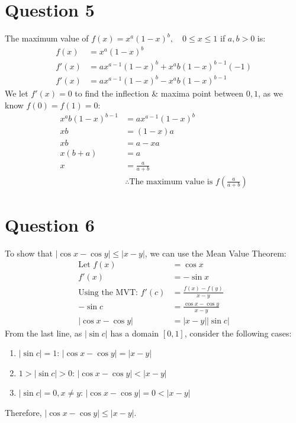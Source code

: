 \documentclass{article}
\begin{document}
\section*{Question 5}
The maximum value of $f(x)=x^a(1-x)^b,\quad0\leq x\leq1$ if $a,b > 0$ is:
\begin{align*}
    f(x)  & =x^a(1-x)^b                          \\
    f'(x) & =ax^{a-1}(1-x)^b+x^ab(1-x)^{b-1}(-1) \\
    f'(x) & =ax^{a-1}(1-x)^b-x^ab(1-x)^{b-1}
\end{align*}
We let $f'(x) = 0$ to find the inflection \& maxima point between $0,1$, as we know $f(0)=f(1)=0$:
\begin{align*}
    x^ab(1-x)^{b-1} & =ax^{a-1}(1-x)^b                                        \\
    xb              & =(1-x)a                                                 \\
    xb              & = a - xa                                                \\
    x(b+a)          & = a                                                     \\
    x               & = \frac{a}{a+b}                                         \\
                    & \therefore \text{The maximum value is }f(\frac{a}{a+b})
\end{align*}

\section*{Question 6}
To show that $|\cos x-\cos y|\leq|x-y|$, we can use the Mean Value Theorem:
\begin{align*}
    \text{Let }f(x)             & = \cos x                    \\
    f'(x)                       & = -\sin x                   \\
    \text{Using the MVT: }f'(c) & = \frac{f(x)-f(y)}{x-y}     \\
    -\sin c                     & = \frac{\cos x-\cos y}{x-y} \\
    |\cos x-\cos y|             & = |x-y||\sin c|
\end{align*}
From the last line, as $|\sin c|$ has a domain $[0,1]$, consider the following cases:
\begin{enumerate}
    \item $|\sin c| = 1$: $|\cos x-\cos y|=|x-y|$
    \item $1 > |\sin c| > 0$: $|\cos x-\cos y|<|x-y|$
    \item $|\sin c| = 0, x \ne y$: $|\cos x-\cos y|=0<|x-y|$
\end{enumerate}
Therefore, $|\cos x-\cos y|\leq|x-y|$.
\end{document}
